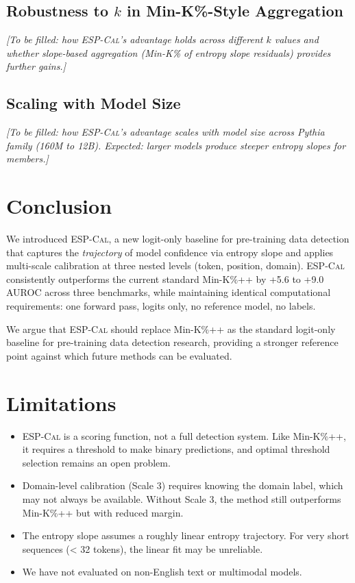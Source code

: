 \documentclass[11pt]{article}
\newcommand{\ours}{\textsc{ESP-Cal}}
\begin{document}
\subsection{Robustness to $k$ in Min-K\%-Style Aggregation}

\textit{[To be filled: how \ours{}'s advantage holds across different $k$ values and whether slope-based aggregation (Min-K\% of entropy slope residuals) provides further gains.]}

\subsection{Scaling with Model Size}

\textit{[To be filled: how \ours{}'s advantage scales with model size across Pythia family (160M to 12B). Expected: larger models produce steeper entropy slopes for members.]}

\section{Conclusion}
\label{sec:conclusion}

We introduced \ours{}, a new logit-only baseline for pre-training data detection that captures the \textit{trajectory} of model confidence via entropy slope and applies multi-scale calibration at three nested levels (token, position, domain).
\ours{} consistently outperforms the current standard Min-K\%++ by +5.6 to +9.0 AUROC across three benchmarks, while maintaining identical computational requirements: one forward pass, logits only, no reference model, no labels.

We argue that \ours{} should replace Min-K\%++ as the standard logit-only baseline for pre-training data detection research, providing a stronger reference point against which future methods can be evaluated.

\section*{Limitations}

\begin{itemize}
    \item \ours{} is a scoring function, not a full detection system. Like Min-K\%++, it requires a threshold to make binary predictions, and optimal threshold selection remains an open problem.
    \item Domain-level calibration (Scale 3) requires knowing the domain label, which may not always be available. Without Scale 3, the method still outperforms Min-K\%++ but with reduced margin.
    \item The entropy slope assumes a roughly linear entropy trajectory. For very short sequences (< 32 tokens), the linear fit may be unreliable.
    \item We have not evaluated on non-English text or multimodal models.
\end{itemize}
\end{document}
